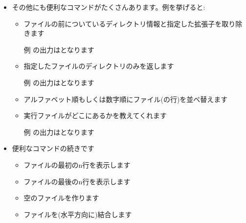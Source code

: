 \documentclass{jsarticle}
\begin{document}
\begin{itemize}

\item その他にも便利なコマンドがたくさんあります。例を挙げると:

	\begin{itemize}
	\item {\color{red}}

	ファイルの前についているディレクトリ情報と指定した拡張子を取り除きます

	例 {\color{red}}の出力は{\color{red}}となります

	\item {\color{red}}

	指定したファイルのディレクトリのみを返します

	例 {\color{red}}の出力は{\color{red}}となります

	\item {\color{red}}

	アルファベット順もしくは数字順にファイル(の行)を並べ替えます

	\item {\color{red}}

	実行ファイルがどこにあるかを教えてくれます

	例 {\color{red}}の出力は{\color{red}}となります

	\end{itemize}
\end{itemize}




\begin{itemize}
\item 便利なコマンドの続きです

	\begin{itemize}

	\item {\color{red}}

	ファイルの最初のn行を表示します

	\item {\color{red}}

	ファイルの最後のn行を表示します

	\item {\color{red}}

	空のファイルを作ります

	\item {\color{red}}

	ファイルを(水平方向に)結合します

	\end{itemize}

\end{itemize}
\end{document}
